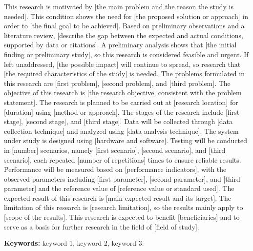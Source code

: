 \begin{halamanbaru}\end{halamanbaru}
\begin{abstrak}
This research is motivated by [the main problem and the reason the study is needed]. This condition shows the need for [the proposed solution or approach] in order to [the final goal to be achieved]. Based on preliminary observations and a literature review, [describe the gap between the expected and actual conditions, supported by data or citations]. A preliminary analysis shows that [the initial finding or preliminary study], so this research is considered feasible and urgent. If left unaddressed, [the possible impact] will continue to spread, so research that [the required characteristics of the study] is needed. The problems formulated in this research are [first problem], [second problem], and [third problem]. The objective of this research is [the research objective, consistent with the problem statement]. The research is planned to be carried out at [research location] for [duration] using [method or approach]. The stages of the research include [first stage], [second stage], and [third stage]. Data will be collected through [data collection technique] and analyzed using [data analysis technique]. The system under study is designed using [hardware and software]. Testing will be conducted in [number] scenarios, namely [first scenario], [second scenario], and [third scenario], each repeated [number of repetitions] times to ensure reliable results. Performance will be measured based on [performance indicators], with the observed parameters including [first parameter], [second parameter], and [third parameter] and the reference value of [reference value or standard used]. The expected result of this research is [main expected result and its target]. The limitation of this research is [research limitation], so the results mainly apply to [scope of the results]. This research is expected to benefit [beneficiaries] and to serve as a basis for further research in the field of [field of study].

\textbf{Keywords:} keyword 1, keyword 2, keyword 3.
\end{abstrak}

\begin{halamanbaru}\end{halamanbaru}
